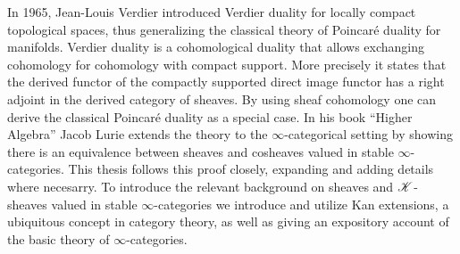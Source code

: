 \documentclass[../thesis.tex]{subfiles}
\begin{document}
In 1965, Jean-Louis Verdier introduced Verdier duality for locally compact topological spaces, thus generalizing the classical theory of Poincaré duality for manifolds.
Verdier duality is a cohomological duality that allows exchanging cohomology for cohomology with compact support.
More precisely it states that the derived functor of the compactly supported direct image functor has a right adjoint in the derived category of sheaves.
By using sheaf cohomology one can derive the classical Poincaré duality as a special case.
In his book ``Higher Algebra'' Jacob Lurie extends the theory to the $\infty$-categorical setting by showing there is an equivalence between sheaves and cosheaves valued in stable $\infty$-categories.
This thesis follows this proof closely, expanding and adding details where necesarry.
To introduce the relevant background on sheaves and $\mathscr{K}$-sheaves valued in stable $\infty$-categories we introduce and utilize Kan extensions, a ubiquitous concept in category theory, as well as giving an expository account of the basic theory of $\infty$-categories.



\end{document}
